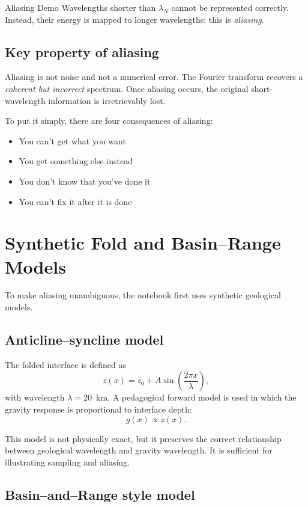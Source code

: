 \begin{activity}{Aliasing Demo}
Wavelengths shorter than $\lambda_N$ cannot be represented correctly.
Instead, their energy is mapped to longer wavelengths:
this is \emph{aliasing}.

\subsection*{Key property of aliasing}

Aliasing is not noise and not a numerical error.  The Fourier transform recovers a \emph{coherent but incorrect} spectrum.  Once aliasing occurs, the original short-wavelength information is irretrievably lost.

To put it simply, there are four consequences of aliasing:
\begin{itemize}
  \item You can't get what you want
  \item You get something else instead
  \item You don't know that you've done it
  \item You can't fix it after it is done
\end{itemize}

\section*{Synthetic Fold and Basin--Range Models}

To make aliasing unambiguous, the notebook first uses synthetic geological models.

\subsection*{Anticline--syncline model}

The folded interface is defined as
\begin{equation}
z(x) = z_0 + A \sin\!\left(\frac{2\pi x}{\lambda}\right),
\end{equation}
with wavelength $\lambda = 20$~km.
A pedagogical forward model is used in which the gravity response is proportional
to interface depth:
\begin{equation}
g(x) \propto z(x).
\end{equation}

This model is not physically exact, but it preserves the correct relationship between
geological wavelength and gravity wavelength.
It is sufficient for illustrating sampling and aliasing.

\subsection*{Basin--and--Range style model}


\end{activity}
